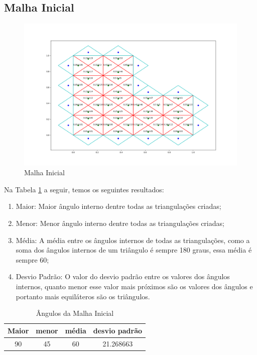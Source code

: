 \newpage
\subsection{Malha Inicial}

\begin{figure}[ht]
    \centering
    \includegraphics[width=1\linewidth]{fig/malha_inicial.png}
    \caption{Malha Inicial}
    \label{fig:malha-inicial}
\end{figure}

Na Tabela \ref{tab:angulos-malha-inicial} a seguir, temos os seguintes resultados:

\begin{enumerate}
    \item Maior: Maior ângulo interno dentre todas as triangulações criadas;
    \item Menor: Menor ângulo interno dentre todas as triangulações criadas;
    \item Média: A média entre os ângulos internos de todas as triangulações, como a soma dos ângulos internos de um triângulo é sempre 180 graus, essa média é sempre 60;
    \item Desvio Padrão: O valor do desvio padrão entre os valores dos ângulos internos, quanto menor esse valor mais próximos são os valores dos ângulos e portanto mais equiláteros são os triângulos.
\end{enumerate}

\begin{table}[hb]
 \centering
 \par\caption{Ângulos da Malha Inicial}
\begin{tabular}{c|c|c|c}
 Maior&menor&média&desvio padrão\\\hline\hline
  90&45&60&21.268663\\\hline
 \end{tabular}
 \label{tab:angulos-malha-inicial}
\end{table}

